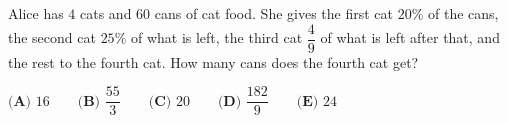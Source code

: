 Alice has $4$ cats and $60$ cans of cat food. She gives the first cat $20\%$ of the cans, the second cat $25\%$ of what is left, the third cat $\dfrac49$ of what is left after that, and the rest to the fourth cat. How many cans does the fourth cat get?

$\textbf{(A) }16\qquad\textbf{(B) }\dfrac{55}{3}\qquad\textbf{(C) }20\qquad\textbf{(D) }\dfrac{182}{9}\qquad\textbf{(E) }24$
